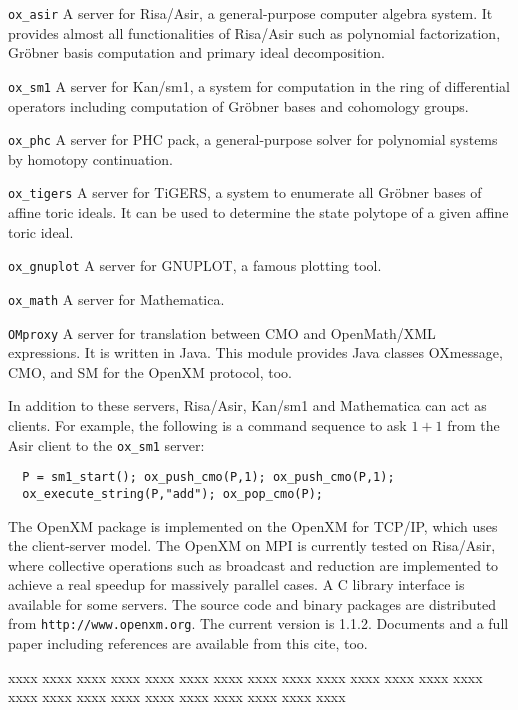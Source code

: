 \begin{description}
\item{\tt ox\_asir}
A server for Risa/Asir, a general-purpose computer algebra
system. It provides almost
all functionalities of Risa/Asir such as polynomial factorization,
Gr\"obner basis computation and primary ideal decomposition.
\item{\tt ox\_sm1}
A server for Kan/sm1, a system for computation in 
the ring of differential operators including computation of Gr\"obner bases
and cohomology groups.
\item {\tt ox\_phc}
A server for PHC pack, a general-purpose solver for
polynomial systems by homotopy continuation. 
\item {\tt ox\_tigers}
A server for TiGERS, a system to enumerate
all Gr\"obner bases of affine toric ideals.
It can be used to determine the state polytope
of a given affine toric ideal.
\item {\tt ox\_gnuplot}
A server for GNUPLOT, a famous plotting tool.
\item {\tt ox\_math}
A server for Mathematica.
\item {\tt OMproxy}
A server for translation between CMO and OpenMath/XML expressions.
It is written in Java.
This module provides Java classes OXmessage, CMO, and SM
for the OpenXM protocol, too.
\end{description}
In addition to these servers, Risa/Asir, Kan/sm1 and Mathematica
can act as clients. 
For example, the following is a command sequence to ask $1+1$ from
the Asir client to the {\tt ox\_sm1} server:
\begin{verbatim}
  P = sm1_start(); ox_push_cmo(P,1); ox_push_cmo(P,1);
  ox_execute_string(P,"add"); ox_pop_cmo(P);
\end{verbatim}
The OpenXM package is implemented on the  OpenXM for TCP/IP, 
which uses the client-server model.
The OpenXM on MPI is currently tested on Risa/Asir,
where collective operations such as broadcast and reduction
are implemented to achieve a real speedup for massively parallel cases.
A C library interface is available for some servers.
The source code and binary packages are distributed from
{\tt http://www.openxm.org}.
The current version is 1.1.2.
Documents and a full paper including references are available
from this cite, too.

xxxx xxxx xxxx xxxx xxxx xxxx xxxx xxxx xxxx xxxx xxxx xxxx
xxxx xxxx xxxx xxxx xxxx xxxx xxxx xxxx xxxx xxxx xxxx xxxx




